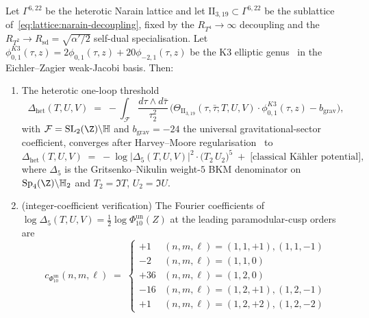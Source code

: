\begin{theorem}
\label{thm:thqg-heterotic-delta5-lift}
Let $\Gamma^{6,22}$ be the heterotic Narain lattice and let
$\mathrm{II}_{3,19}\subset\Gamma^{6,22}$ be the sublattice
of~\eqref{eq:lattice:narain-decoupling}, fixed by the
$R_{T^4}\to\infty$ decoupling and the $R_{T^2}\to R_{\mathrm{sd}}
= \sqrt{\alpha'/2}$ self-dual specialisation. Let
$\phi_{0,1}^{K3}(\tau, z) = 2\phi_{0,1}(\tau, z) + 20\phi_{-2,1}(\tau, z)$
be the K3 elliptic genus~\cite{EguchiOoguriTachikawa2010} in the
Eichler--Zagier weak-Jacobi basis. Then:
\begin{enumerate}[label=\textup{(\roman*)}]
\item The heterotic one-loop threshold
\[
 \Delta_{\mathrm{het}}(T, U, V)
 \;=\;
 -\int_{\mathcal{F}}
 \frac{d\tau\wedge d\bar\tau}{\tau_2^2}\,
 \bigl(
 \Theta_{\mathrm{II}_{3,19}}(\tau, \bar\tau; T, U, V)\cdot
 \phi_{0,1}^{K3}(\tau, z)
 -
 b_{\mathrm{grav}}
 \bigr),
\]
with $\mathcal{F} = \mathrm{SL}_2(\Z)\backslash\mathbb{H}$ and
$b_{\mathrm{grav}} = -24$ the universal gravitational-sector
coefficient, converges after Harvey--Moore
regularisation~\cite[\S 5]{HarveyMoore1996} to
\begin{equation}\label{eq:thqg-het-delta5-identity}
\Delta_{\mathrm{het}}(T, U, V)
\;=\;
-\log\bigl|\Delta_5(T, U, V)\bigr|^2
\cdot
\bigl(T_2\, U_2\bigr)^5
\;+\;
\bigl[\text{classical K\"ahler potential}\bigr],
\end{equation}
where $\Delta_5$ is the Gritsenko--Nikulin weight-$5$ BKM denominator
on $\mathrm{Sp}_4(\Z)\backslash\mathbb{H}_2$ and
$T_2 = \Im T$, $U_2 = \Im U$.
\item \textup{(integer-coefficient verification)} The Fourier
coefficients of
$\log\Delta_5(T, U, V) =
\tfrac{1}{2}\log\Phi_{10}^{\mathrm{un}}(Z)$
at the leading paramodular-cusp orders
are
\[
c_{\Phi_{10}^{\mathrm{un}}}(n, m, \ell)
\;=\;
\begin{cases}
+1 & (n, m, \ell) = (1, 1, +1), (1, 1, -1)\\
-2 & (n, m, \ell) = (1, 1, 0)\\
+36& (n, m, \ell) = (1, 2, 0)\\
-16& (n, m, \ell) = (1, 2, +1), (1, 2, -1)\\
+1 & (n, m, \ell) = (1, 2, +2), (1, 2, -2)
\end{cases}
\]
\end{enumerate}
\end{theorem}
